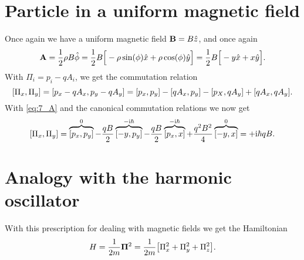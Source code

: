 \documentclass[11pt,letter, swedish, english
]{article}
\begin{document}
\section{Particle in a uniform magnetic field}
Once again we have a uniform magnetic field $\vb{B}=B\hat{z}$, and
once again 
\begin{equation}\label{eq:7_A}
\vb{A}=\frac{1}{2}\rho B\hat{\phi}
=\frac{1}{2}B\Big[-\rho\sin(\phi)\hat{x}+\rho\cos(\phi)\hat{y}\Big]
=\frac{1}{2}B\Big[-y\hat{x}+x\hat{y}\Big].
\end{equation}
With $\Pi_i=p_i-qA_i$, we get the commutation relation
\begin{equation}
\comm{\Pi_x}{\Pi_y}=\comm{p_x-qA_x}{p_y-qA_y}
=\comm{p_x}{p_y}-\comm{qA_x}{p_y}-\comm{p_X}{qA_y}+\comm{qA_x}{qA_y}.
\end{equation}
With \eqref{eq:7_A} and the canonical commutation relations we now get
\begin{equation}\label{eq:7_comm}
\comm{\Pi_x}{\Pi_y}
=\overbrace{\comm{p_x}{p_y}}^{0}
-\frac{qB}{2}\overbrace{\comm{-y}{p_y}}^{-\ii\hbar}
-\frac{qB}{2}\overbrace{\comm{p_x}{x}}^{-\ii\hbar}
+\frac{q^2B^2}{4}\overbrace{\comm{-y}{x}}^{0}
=+\ii\hbar qB.
\end{equation}

\section{Analogy with the harmonic oscillator}
With this prescription for dealing with magnetic fields we get the
Hamiltonian 
\begin{equation}\label{eq:7_H}
H=\frac{1}{2m}\vb{\Pi}^2=\frac{1}{2m}\qty[\Pi_x^2+\Pi_y^2+\Pi_z^2]. 
\end{equation}
\end{document}
